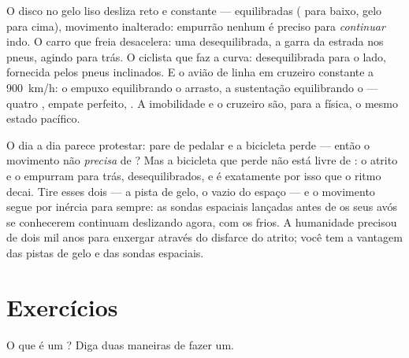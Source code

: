 \begin{example}\label{ex:g9:uniform-varied-motion:reading}
O disco no gelo liso desliza reto e constante ---  equilibradas
( para baixo, gelo para cima), movimento inalterado: empurrão
nenhum é preciso para \emph{continuar} indo. O carro que freia
desacelera: uma  desequilibrada, a garra da estrada nos pneus,
agindo para trás. O ciclista que faz a curva:  desequilibrada
para o lado, fornecida pelos pneus inclinados. E o avião de linha em
cruzeiro constante a \qty{900}{km/h}: o empuxo equilibrando o
arrasto, a sustentação equilibrando o  --- quatro , empate
perfeito, . A imobilidade e o cruzeiro são, para a
física, o mesmo estado pacífico.
\end{example}

\begin{remark}\label{rem:g9:uniform-varied-motion:surprise}
O dia a dia parece protestar: pare de pedalar e a bicicleta perde
 --- então o movimento não \emph{precisa} de ? Mas a
bicicleta que perde  não está livre de : o atrito e o
 empurram para trás, desequilibrados, e é exatamente por isso que o
ritmo decai. Tire esses dois --- a pista de gelo, o vazio do espaço
--- e o movimento segue por inércia para sempre: as sondas espaciais
lançadas antes de os seus avós se conhecerem continuam deslizando
agora, com os  frios. A humanidade precisou de dois mil anos
para enxergar através do disfarce do atrito; você tem a vantagem das
pistas de gelo e das sondas espaciais.
\end{remark}

\section{Exercícios}

\begin{exercise}[$\star$]\label{exo:g9:uniform-varied-motion:1}
O que é um ? Diga duas maneiras de
fazer um.
\end{exercise}

